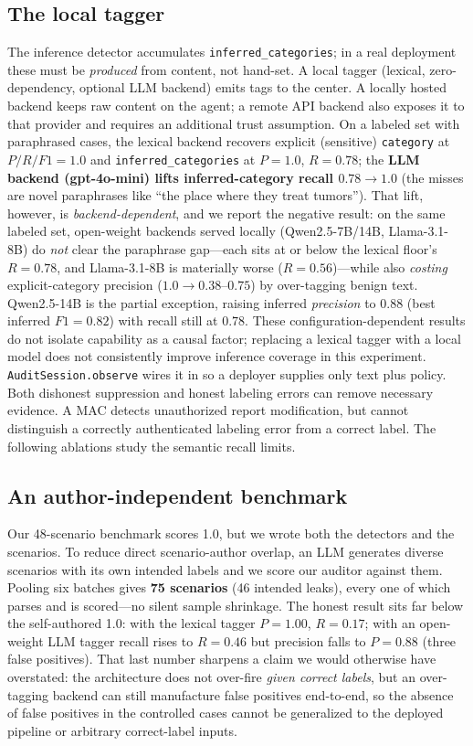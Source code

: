 \subsection{The local tagger}
The inference
detector accumulates \texttt{inferred\_categories}; in a real deployment these
must be \emph{produced} from content, not hand-set. A local tagger (lexical,
zero-dependency, optional LLM backend) emits tags to the center. A locally hosted backend keeps raw content on the
agent; a remote API backend also exposes it to that provider and requires an
additional trust assumption. On a labeled set with paraphrased cases, the lexical backend recovers explicit
(sensitive) \texttt{category} at $P/R/F1=1.0$ and \texttt{inferred\_categories}
at $P=1.0$, $R=0.78$; the \textbf{LLM backend (gpt-4o-mini) lifts inferred-category
recall $0.78\to1.0$} (the misses are novel paraphrases like ``the place where they
treat tumors'').
That lift, however, is \emph{backend-dependent}, and we report the negative result:
on the same labeled set, open-weight backends served locally (Qwen2.5-7B/14B,
Llama-3.1-8B) do \emph{not} clear the paraphrase gap---each sits at or below the
lexical floor's $R{=}0.78$, and Llama-3.1-8B is materially worse ($R{=}0.56$)---while
also \emph{costing} explicit-category precision ($1.0\to0.38$--$0.75$) by over-tagging
benign text. Qwen2.5-14B is the partial exception, raising inferred \emph{precision}
to $0.88$ (best inferred $F1{=}0.82$) with recall still at $0.78$. These configuration-dependent results do not isolate capability as a causal
factor; replacing a lexical tagger with a local model does not consistently
improve inference coverage in this experiment.
\texttt{AuditSession.observe} wires it in so a deployer supplies only text plus
policy. Both dishonest suppression and honest labeling errors can remove
necessary evidence. A MAC detects unauthorized report modification, but cannot
distinguish a correctly authenticated labeling error from a correct label.
The following ablations study the semantic recall limits.

\subsection{An author-independent benchmark}
Our 48-scenario benchmark scores 1.0, but we wrote both the detectors and the
scenarios. To reduce direct scenario-author overlap, an LLM generates diverse
scenarios with its own intended labels and we score our auditor against them. Pooling
six batches gives \textbf{75 scenarios} (46 intended leaks), every one of which parses
and is scored---no silent sample shrinkage. The honest result sits far below the
self-authored 1.0: with the lexical tagger $P{=}1.00$, $R{=}0.17$; with an open-weight
LLM tagger recall rises to $R{=}0.46$ but precision falls to $P{=}0.88$ (three false
positives). That last number sharpens a claim we would otherwise have overstated: the
architecture does not over-fire \emph{given correct labels}, but an over-tagging
backend can still manufacture false positives end-to-end, so the absence of false positives in the controlled cases cannot be
generalized to the deployed pipeline or arbitrary correct-label inputs.


